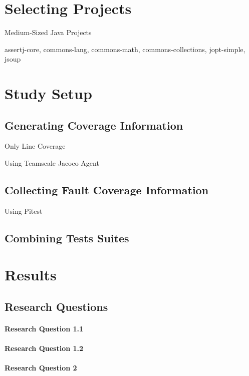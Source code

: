 \section{Selecting Projects}

Medium-Sized Java Projects

assertj-core, commons-lang, commons-math, commons-collections, jopt-simple, jsoup

\section{Study Setup}

\subsection{Generating Coverage Information}

Only Line Coverage

Using Teamscale Jacoco Agent

\subsection{Collecting Fault Coverage Information}

Using Pitest

\subsection{Combining Tests Suites}

\section{Results}

\subsection{Research Questions}

\paragraph{Research Question 1.1}

\paragraph{Research Question 1.2}

\paragraph{Research Question 2}

